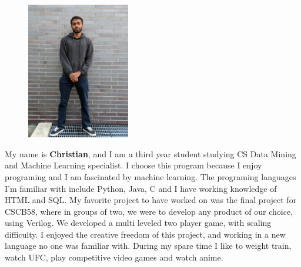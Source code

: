 \documentclass[12pt]{scrreprt}
\begin{document}
\begin{figure} 
	\includegraphics[angle=-90,origin=c,width=0.4\textwidth]{christian}
\end{figure}
My name is \textbf{Christian}, and I am a third year student studying CS Data Mining and Machine Learning specialist. I choose this program because I enjoy programing and I am fascinated by machine learning. The programing languages I’m familiar with include Python, Java, C and I have working knowledge of HTML and SQL. My favorite project to have worked on was the final project for CSCB58, where in groups of two, we were to develop any product of our choice, using Verilog. We developed a multi leveled two player game, with scaling difficulty. I enjoyed the creative freedom of this project, and working in a new language no one was familiar with. During my spare time I like to weight train, watch UFC, play competitive video games and watch anime.
\end{document}

